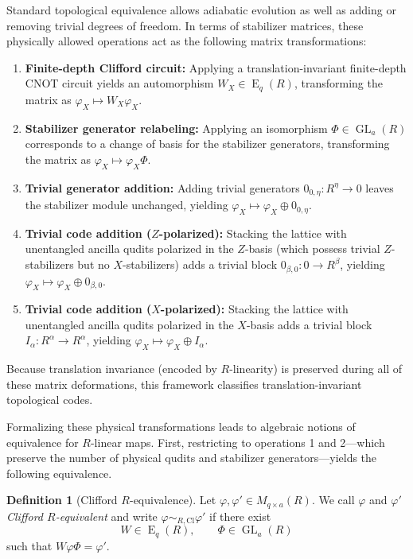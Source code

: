 \documentclass[aps,prx,english,superscriptaddress,twocolumn,tightenlines,showpacs,longbibliography,floatfix,amsfonts]{revtex4-2}
\theoremstyle{remark}
\theoremstyle{definition}
\newtheorem{definition}{Definition}
\begin{document}
Standard topological equivalence allows adiabatic evolution as well as adding or removing trivial degrees of freedom. In terms of stabilizer matrices, these physically allowed operations act as the following matrix transformations:
\begin{enumerate}
	\item \textbf{Finite-depth Clifford circuit:} Applying a translation-invariant finite-depth CNOT circuit yields an automorphism $W_X \in \operatorname{E}_q(R)$, transforming the matrix as $\varphi_X \mapsto W_X \varphi_X$.
	\item \textbf{Stabilizer generator relabeling:} Applying an isomorphism $\Phi \in \operatorname{GL}_a(R)$ corresponds to a change of basis for the stabilizer generators, transforming the matrix as $\varphi_X \mapsto \varphi_X \Phi$.
	\item \textbf{Trivial generator addition:} Adding trivial generators $0_{0,\eta}\colon R^\eta \to 0$ leaves the stabilizer module unchanged, yielding $\varphi_X \mapsto \varphi_X \oplus 0_{0,\eta}$.
	\item \textbf{Trivial code addition ($Z$-polarized):} Stacking the lattice with unentangled ancilla qudits polarized in the $Z$-basis (which possess trivial $Z$-stabilizers but no $X$-stabilizers) adds a trivial block $0_{\beta,0}\colon 0 \to R^{\beta}$, yielding $\varphi_X \mapsto \varphi_X \oplus 0_{\beta,0}$.
	\item \textbf{Trivial code addition ($X$-polarized):} Stacking the lattice with unentangled ancilla qudits polarized in the $X$-basis adds a trivial block $I_{\alpha}\colon R^{\alpha} \to R^{\alpha}$, yielding $\varphi_X \mapsto \varphi_X \oplus I_{\alpha}$.
\end{enumerate}

Because translation invariance (encoded by $R$-linearity) is preserved during all of these matrix deformations, this framework classifies translation-invariant topological codes.

Formalizing these physical transformations leads to algebraic notions of equivalence for \(R\)-linear maps. First, restricting to operations 1 and 2---which preserve the number of physical qudits and stabilizer generators---yields the following equivalence.

\begin{definition}[Clifford \(R\)-equivalence]
	Let $\varphi, \varphi' \in M_{q \times a}(R)$. We call $\varphi$ and $\varphi'$ \textit{Clifford \(R\)-equivalent} and write $\varphi \sim_{R,\mathrm{Cl}} \varphi'$ if there exist
	\begin{equation}
		W \in \operatorname{E}_q(R), \qquad \Phi \in \operatorname{GL}_a(R)
	\end{equation}
	such that $W \varphi \Phi = \varphi'$.
\end{definition}
\end{document}
